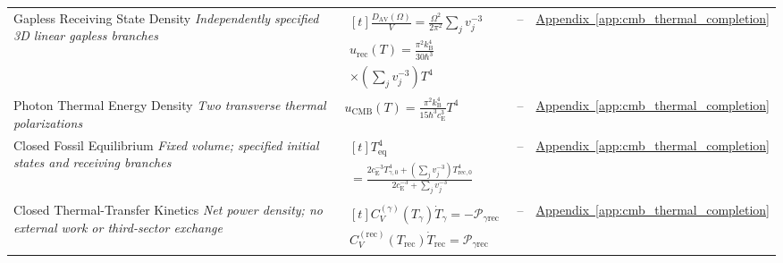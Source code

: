 \begin{longtable}{@{} p{4.5cm} p{6cm} c p{4cm} @{}}
{\raggedright Gapless Receiving State Density \newline \textit{Independently specified 3D linear gapless branches}\par} & {\raggedright $\begin{gathered}[t]\frac{D_{\mathrm{AV}}(\Omega)}V=\frac{\Omega^2}{2\pi^2}\sum_jv_j^{-3} \\ u_{\mathrm{rec}}(T)=\frac{\pi^2k_{\mathrm B}^4}{30\hbar^3} \\ \times\left(\sum_jv_j^{-3}\right)T^4\end{gathered}$\par} & -- & {\raggedright \hyperref[app:cmb_thermal_completion]{Appendix~\ref*{app:cmb_thermal_completion}}\par} \\

{\raggedright Photon Thermal Energy Density \newline \textit{Two transverse thermal polarizations}\par} & {\raggedright $u_{\mathrm{CMB}}(T)=\frac{\pi^2k_{\mathrm B}^4}{15\hbar^3c_{\mathrm E}^3}T^4$\par} & -- & {\raggedright \hyperref[app:cmb_thermal_completion]{Appendix~\ref*{app:cmb_thermal_completion}}\par} \\

{\raggedright Closed Fossil Equilibrium \newline \textit{Fixed volume; specified initial states and receiving branches}\par} & {\raggedright $\begin{gathered}[t]T_{\mathrm{eq}}^4 \\ =\frac{2c_{\mathrm E}^{-3}T_{\gamma,0}^4+\left(\sum_jv_j^{-3}\right)T_{\mathrm{rec},0}^4}{2c_{\mathrm E}^{-3}+\sum_jv_j^{-3}}\end{gathered}$\par} & -- & {\raggedright \hyperref[app:cmb_thermal_completion]{Appendix~\ref*{app:cmb_thermal_completion}}\par} \\

{\raggedright Closed Thermal-Transfer Kinetics \newline \textit{Net power density; no external work or third-sector exchange}\par} & {\raggedright $\begin{gathered}[t]C_V^{(\gamma)}(T_\gamma)\dot T_\gamma=-\mathcal P_{\gamma\mathrm{rec}} \\ C_V^{(\mathrm{rec})}(T_{\mathrm{rec}})\dot T_{\mathrm{rec}}=\mathcal P_{\gamma\mathrm{rec}}\end{gathered}$\par} & -- & {\raggedright \hyperref[app:cmb_thermal_completion]{Appendix~\ref*{app:cmb_thermal_completion}}\par} \\


\end{longtable}
